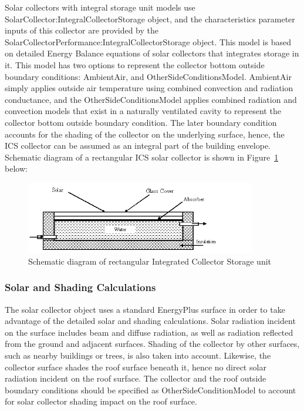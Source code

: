 Solar collectors with integral storage unit models use SolarCollector:IntegralCollectorStorage object, and the characteristics parameter inputs of this collector are provided by the SolarCollectorPerformance:IntegralCollectorStorage object. This model is based on detailed Energy Balance equations of solar collectors that integrates storage in it. This model has two options to represent the collector bottom outside boundary conditions: AmbientAir, and OtherSideConditionsModel. AmbientAir simply applies outside air temperature using combined convection and radiation conductance, and the OtherSideConditionsModel applies combined radiation and convection models that exist in a naturally ventilated cavity to represent the collector bottom outside boundary condition. The later boundary condition accounts for the shading of the collector on the underlying surface, hence, the ICS collector can be assumed as an integral part of the building envelope. Schematic diagram of a rectangular ICS solar collector is shown in Figure~\ref{fig:schematic-diagram-of-rectangular-integrated} below:

\begin{figure}[hbtp] %
\centering
\includegraphics[width=0.9\textwidth, height=0.9\textheight, keepaspectratio=true]{media/image6502.png}
\caption{Schematic diagram of rectangular Integrated Collector Storage unit \protect \label{fig:schematic-diagram-of-rectangular-integrated}}
\end{figure}

\subsubsection{Solar and Shading Calculations}\label{solar-and-shading-calculations-1}

The solar collector object uses a standard EnergyPlus surface in order to take advantage of the detailed solar and shading calculations. Solar radiation incident on the surface includes beam and diffuse radiation, as well as radiation reflected from the ground and adjacent surfaces. Shading of the collector by other surfaces, such as nearby buildings or trees, is also taken into account. Likewise, the collector surface shades the roof surface beneath it, hence no direct solar radiation incident on the roof surface. The collector and the roof outside boundary conditions should be specified as OtherSideConditionModel to account for solar collector shading impact on the roof surface.

